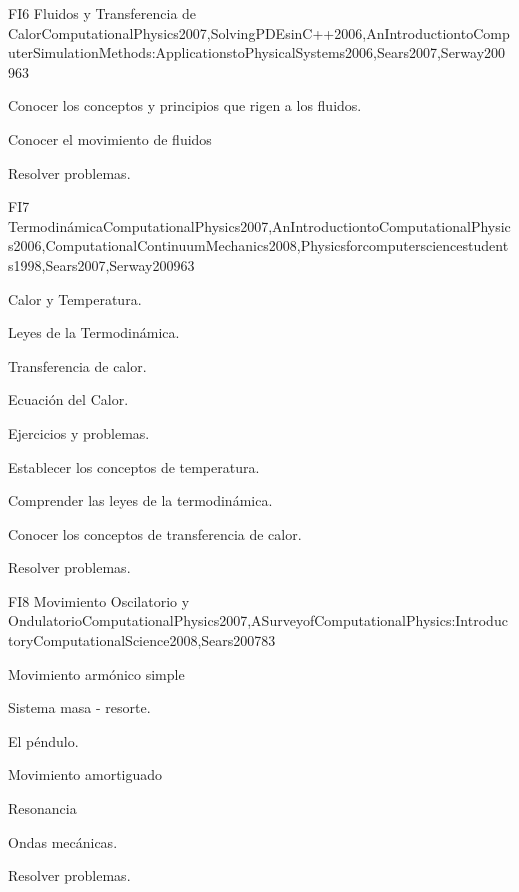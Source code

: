 \begin{syllabus}
\begin{unit}{FI6 Fluidos y Transferencia de Calor}{ComputationalPhysics2007,SolvingPDEsinC++2006,AnIntroductiontoComputerSimulationMethods:ApplicationstoPhysicalSystems2006,Sears2007,Serway2009}{6}{3}
   \begin{learningoutcomes}
      \item Conocer los conceptos y principios que rigen a los fluidos.
      \item Conocer el movimiento de fluidos 
      \item Resolver problemas.
   \end{learningoutcomes}
\end{unit}

\begin{unit}{FI7 Termodinámica}{ComputationalPhysics2007,AnIntroductiontoComputationalPhysics2006,ComputationalContinuumMechanics2008,Physicsforcomputersciencestudents1998,Sears2007,Serway2009}{6}{3}
\begin{topics}
      \item Calor y Temperatura.
      \item Leyes de la Termodinámica.
      \item Transferencia de calor.
      \item Ecuación del Calor.
      \item Ejercicios y problemas.
  \end{topics}

   \begin{learningoutcomes}
      \item Establecer los conceptos de temperatura.
      \item Comprender las leyes de la termodinámica.
      \item Conocer los conceptos de transferencia de calor.
      \item Resolver problemas.
   \end{learningoutcomes}
\end{unit}

\begin{unit}{FI8 Movimiento Oscilatorio y Ondulatorio}{ComputationalPhysics2007,ASurveyofComputationalPhysics:IntroductoryComputationalScience2008,Sears2007}{8}{3}
\begin{topics}
      \item Movimiento armónico simple
      \item Sistema masa - resorte.
      \item El péndulo.
      \item Movimiento amortiguado
      \item Resonancia
      \item Ondas mecánicas.
      \item Resolver problemas.
  \end{topics}


\end{unit}
\end{syllabus}
